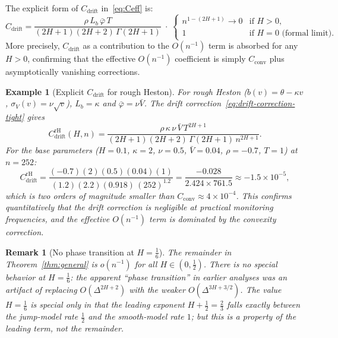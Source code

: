 \documentclass[12pt]{article}
\newtheorem{remark}{Remark}
\newtheorem{example}{Example}
\theoremstyle{definition}
\begin{document}
The explicit form of $C_{\mathrm{drift}}$ in~\eqref{eq:Ceff} is:
\begin{equation}\label{eq:Cdrift-explicit}
  C_{\mathrm{drift}}
  = \frac{\rho\,L_b\,\bar\varphi\,T}
  {(2H{+}1)(2H{+}2)\,\Gamma(2H{+}1)}\;\cdot\;
  \begin{cases}
    n^{1-(2H+1)} \to 0 & \text{if } H > 0, \\
    1 & \text{if } H = 0 \text{ (formal limit)}.
  \end{cases}
\end{equation}
More precisely, $C_{\mathrm{drift}}$ as a contribution to the
$O(n^{-1})$ term is absorbed for any $H > 0$, confirming that
the effective $O(n^{-1})$ coefficient is simply $C_{\mathrm{conv}}$
plus asymptotically vanishing corrections.

\begin{example}[Explicit $C_{\mathrm{drift}}$ for rough Heston]
\label{ex:Cdrift-rH}
For rough Heston ($b(v) = \theta - \kappa v$, $\sigma_V(v) = \nu\sqrt{v}$),
$L_b = \kappa$ and $\bar\varphi = \nu\bar V$.
The drift correction~\eqref{eq:drift-correction-tight} gives
\[
  C_{\mathrm{drift}}^{\mathrm{rH}}(H,n)
  = \frac{\rho\,\kappa\,\nu\,\bar V\,T^{2H+1}}
  {(2H{+}1)(2H{+}2)\,\Gamma(2H{+}1)\,n^{2H+1}}.
\]
For the base parameters ($H = 0.1$, $\kappa = 2$, $\nu = 0.5$,
$\bar V = 0.04$, $\rho = -0.7$, $T = 1$) at $n = 252$:
\[
  C_{\mathrm{drift}}^{\mathrm{rH}}
  = \frac{(-0.7)(2)(0.5)(0.04)(1)}
  {(1.2)(2.2)(0.918)\,(252)^{1.2}}
  = \frac{-0.028}{2.424 \times 761.5}
  \approx -1.5 \times 10^{-5},
\]
which is two orders of magnitude smaller than
$C_{\mathrm{conv}} \approx 4 \times 10^{-4}$.
This confirms quantitatively that the drift correction is negligible
at practical monitoring frequencies, and the effective $O(n^{-1})$
term is dominated by the convexity correction.
\end{example}

\begin{remark}[No phase transition at $H = \tfrac16$]
\label{rem:no-phase-transition}
The remainder in Theorem~\ref{thm:general} is $o(n^{-1})$ for all
$H \in (0,\tfrac12)$.
There is no special behavior at $H = \tfrac16$: the apparent
``phase transition'' in earlier analyses was an artifact of
replacing $O(\Delta^{2H+2})$ with the weaker $O(\Delta^{3H+3/2})$.
The value $H = \tfrac16$ is special only in that the leading exponent
$H + \tfrac12 = \tfrac23$ falls exactly between the jump-model rate
$\tfrac12$ and the smooth-model rate $1$; but this is a property of
the leading term, not the remainder.
\end{remark}
\end{document}
